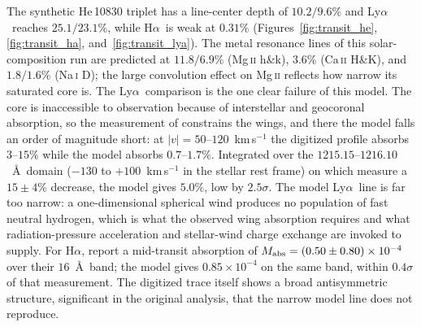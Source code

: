 \documentclass[twocolumn]{aastex702}
\newcommand{\Lya}{\mbox{Ly}\ensuremath{\alpha}}
\newcommand{\Ha}{\mbox{H}\ensuremath{\alpha}}
\begin{document}
The synthetic \mbox{He\,10830} triplet has a line-center depth of $10.2/9.6\%$ and \Lya\
reaches $25.1/23.1\%$, while \Ha\ is weak at $0.31\%$ (Figures~\ref{fig:transit_he},
\ref{fig:transit_ha}, and~\ref{fig:transit_lya}). The metal resonance lines of this
solar-composition run are predicted at
$11.8/6.9\%$ (\mbox{Mg\,\textsc{ii}} h\&k), $3.6\%$ (\mbox{Ca\,\textsc{ii}} H\&K), and
$1.8/1.6\%$ (\mbox{Na\,\textsc{i}} D); the large convolution effect on
\mbox{Mg\,\textsc{ii}} reflects how narrow its saturated core is. The \Lya\ comparison is
the one clear failure of this model. The core is inaccessible to observation because of
interstellar and geocoronal absorption, so the measurement of \citet{VidalMadjar2003}
constrains the wings, and there the model falls an order of magnitude short: at
$|v|=50$--$120$~km\,s$^{-1}$ the digitized profile absorbs $3$--$15\%$ while the model
absorbs $0.7$--$1.7\%$. Integrated over the $1215.15$--$1216.10$~\AA\ domain
($-130$ to $+100$~km\,s$^{-1}$ in the stellar rest frame) on which
\citet{VidalMadjar2003} measure a $15\pm4\%$ decrease, the model gives $5.0\%$, low by
$2.5\sigma$. The model \Lya\ line is far too narrow:
a one-dimensional spherical wind produces no population of fast neutral hydrogen, which
is what the observed wing absorption requires and what radiation-pressure acceleration
and stellar-wind charge exchange are invoked to supply. For \Ha, \citet{Jensen2012}
report a mid-transit absorption of $M_{\rm abs}=(0.50\pm0.80)\times10^{-4}$ over their
$16$~\AA\ band; the model gives $0.85\times10^{-4}$ on the same band, within $0.4\sigma$
of that measurement. The digitized trace itself shows a broad antisymmetric structure,
significant in the original analysis, that the narrow model line does not reproduce.
\end{document}
